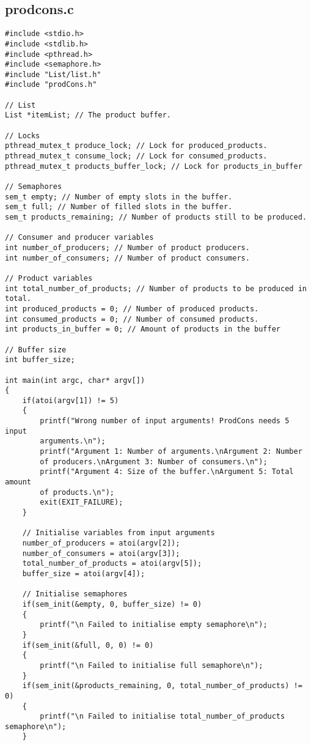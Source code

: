 \subsection{prodcons.c}
\begin{lstlisting}
#include <stdio.h>
#include <stdlib.h>
#include <pthread.h>
#include <semaphore.h>
#include "List/list.h"
#include "prodCons.h"

// List
List *itemList; // The product buffer.

// Locks
pthread_mutex_t produce_lock; // Lock for produced_products.
pthread_mutex_t consume_lock; // Lock for consumed_products.
pthread_mutex_t products_buffer_lock; // Lock for products_in_buffer

// Semaphores
sem_t empty; // Number of empty slots in the buffer.
sem_t full; // Number of filled slots in the buffer.
sem_t products_remaining; // Number of products still to be produced.

// Consumer and producer variables
int number_of_producers; // Number of product producers.
int number_of_consumers; // Number of product consumers.

// Product variables
int total_number_of_products; // Number of products to be produced in total.
int produced_products = 0; // Number of produced products.
int consumed_products = 0; // Number of consumed products.
int products_in_buffer = 0; // Amount of products in the buffer

// Buffer size
int buffer_size;

int main(int argc, char* argv[])
{
	if(atoi(argv[1]) != 5)
	{
		printf("Wrong number of input arguments! ProdCons needs 5 input 
		arguments.\n");
		printf("Argument 1: Number of arguments.\nArgument 2: Number 
		of producers.\nArgument 3: Number of consumers.\n");
		printf("Argument 4: Size of the buffer.\nArgument 5: Total amount 
		of products.\n");
		exit(EXIT_FAILURE);
	}

	// Initialise variables from input arguments
	number_of_producers = atoi(argv[2]);
	number_of_consumers = atoi(argv[3]);
	total_number_of_products = atoi(argv[5]);
	buffer_size = atoi(argv[4]);

	// Initialise semaphores
	if(sem_init(&empty, 0, buffer_size) != 0)
	{
		printf("\n Failed to initialise empty semaphore\n");
	}
	if(sem_init(&full, 0, 0) != 0)
	{
		printf("\n Failed to initialise full semaphore\n");
	}
	if(sem_init(&products_remaining, 0, total_number_of_products) != 0)
	{
		printf("\n Failed to initialise total_number_of_products semaphore\n");
	}


\end{lstlisting}
